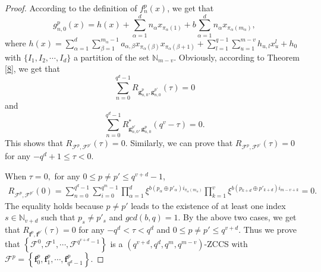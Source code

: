 \documentclass[11pt]{article}
\newcommand{\2} {$2$-to-$1$}
\begin{document}
\begin{proof}
	According to the definition of $ f^{p}_{n}(x) $, we get that
	$$ g^{p}_{n,0}(x)=h(x)+\sum_{\alpha=1}^{d}n_{\alpha}x_{\pi_{\alpha}(1)}+b\sum_{\alpha=1}^{d}n_{\alpha}x_{\pi_{\alpha}(m_{\alpha})}, $$ where $ h(x)=\sum_{\alpha=1}^{d}\sum_{\beta=1}^{m_{\alpha}-1}a_{\alpha,\beta}x_{\pi_{\alpha}(\beta)}x_{\pi_{\alpha}(\beta+1)}+\sum_{l=1}^{q-1}\sum_{u=1}^{m-v}h_{u,l}x^l_u+h_0 $ with $\{I_1, I_2,\cdots,I_d\}$ a partition of the set $\mathbb{N}_{m-v}$. Obviously, according to Theorem \ref{8}, we get that $$\sum^{q^{d}-1}_{n=0}R_{\mathbf{g}^{p}_{n,0},\mathbf{g}^{p'}_{n,0}}(\tau)=0  $$ and $$ \sum^{q^{d}-1}_{n=0}R^{*}_{\mathbf{g}^{p'}_{n,0},\mathbf{g}^{p}_{n,0}}(q^{v}-\tau)=0. $$ This shows that $ R_{\mathcal{F}^{p},\mathcal{F}^{p'}}(\tau)=0. $ Similarly, we can prove that $ R_{\mathcal{F}^{p},\mathcal{F}^{p'}}(\tau)=0 $ for any $ -q^d+1\leq \tau<0. $
	
	When $ \tau=0, $ for any $0\leq p\neq p'\leq q^{v+d}-1$,
	\begin{align*}
		R_{\mathcal{F}^{p},\mathcal{F}^{p'}}(0)=\sum^{q^{d}-1}_{n=0}\sum_{i=0}^{q^m-1}\prod_{\alpha=1}^{d}\xi^{b(p_{\alpha}\oplus p'_{\alpha}) i_{\pi_{\alpha}(m_{\alpha})}}\prod_{k=1}^{v}\xi^{b(p_{k+d}\oplus p'_{k+d})i_{m-v+k}}=0.
	\end{align*}
	The equality holds because $ p\neq p'  $ leads to the existence of at least one index $ s\in \mathbb{N}_{v+d} $ such that $ p_{s}\neq p'_{s} $ and $ gcd(b,q)=1. $
	By the above two cases, we get that $ R_{\mathbf{f}^{p},\mathbf{f}^{p'}}(\tau)=0 $ for any $ -q^d<\tau<q^d $ and $ 0\leq p\neq p'\leq q^{v+d}. $ Thus we prove that $ \left\lbrace \mathcal{F}^{0},\mathcal{F}^{1},\cdots,\mathcal{F}^{q^{v+d}-1}\right\rbrace  $ is a $ (q^{v+d},q^{d},q^{m},q^{m-v}) $-ZCCS with $ \mathcal{F}^p=\left\lbrace \mathbf{f}_{0}^{p},\mathbf{f}_{1}^{p},\cdots,\mathbf{f}_{q^d-1}^{p}\right\rbrace  $.
	
\end{proof}
\end{document}
